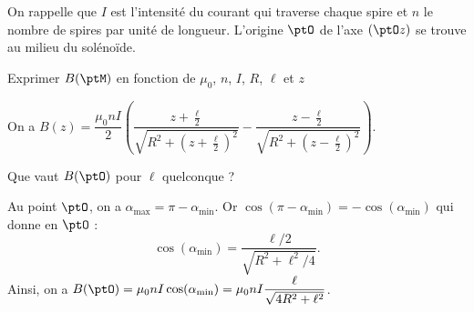 On rappelle que $I$ est l'intensité du courant qui traverse chaque spire et $n$ le nombre de spires par unité de longueur.
L'origine $\ptO$  de l'axe $(\ptO z)$ se trouve au milieu du solénoïde.


\begin{enonce}
Exprimer $B(\ptM)$ en fonction de $\mu_0$, $n$, $I$, $R$, $\ell$ et $z$
\end{enonce}


\begin{corrige}
On a $B(z) = \dfrac{\mu_0 n I}{2} \left( \dfrac{z+\frac{\ell}{2}}{\sqrt{R^2 + \left(z+\frac{\ell}{2} \right)^2}} - \dfrac{z-\frac{\ell}{2}}{\sqrt{R^2 + \left(z-\frac{\ell}{2} \right)^2}} \right)$.
\end{corrige}




\begin{enonce}
Que vaut $B(\ptO)$ pour $\ell$ quelconque ?
\end{enonce}


\begin{corrige}
Au point $\ptO$, on a $\alpha_{\text{max}} = \pi - \alpha_{\text{min}}$. Or $\cos(\pi - \alpha_{\text{min}})= -\cos(\alpha_{\text{min}})$ qui donne en $\ptO$ :
\[
\cos(\alpha_{\text{min}}) = \dfrac{\ell / 2}{\sqrt{R^2+ \ell^2/4}}.
\]
Ainsi, on a $B(\ptO) = \mu_0 n I \cos(\alpha_{\text{min}}) = \mu_0 n I \dfrac{\ell}{\sqrt{4R^2+ \ell^2}}$.
\end{corrige}




